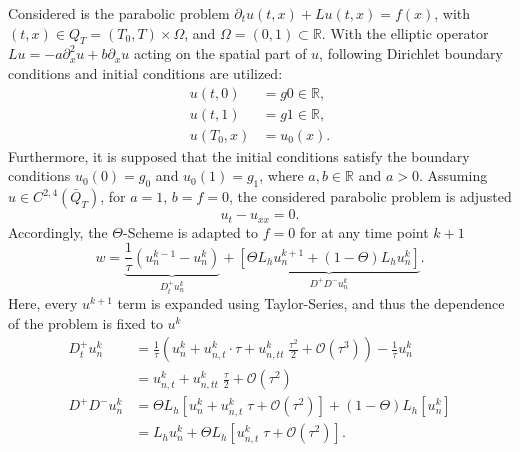 \newcommand{\assignmentDate}{December 15th, 2019}



Considered is the parabolic problem	$\partial_t u(t,x) + L u(t,x) = f(x)$, with $(t,x) \in Q_T = (T_0, T) \times \Omega$, and $\Omega = (0,1) \subset \mathbb{R}$.
With the elliptic operator $Lu = -a\partial_x^2 u + b \partial_x u$ acting on the spatial part of $u$, following Dirichlet boundary conditions and initial conditions are utilized:
\begin{align*}
	u(t,0) &= g0 \in \mathbb{R} \text{,} \\
	u(t,1) &= g1 \in \mathbb{R} \text{,} \\
	u(T_0,x) &= u_0(x)	 		\text{.}
\end{align*}
Furthermore, it is supposed that the initial conditions satisfy the boundary conditions $u_0(0) = g_0$ and $u_0(1) = g_1$, where $a,b \in \mathbb{R}$ and $a>0$.
%
Assuming $u \in C^{2,4}(\bar{Q}_T)$, for $a = 1$, $b = f = 0$, the considered parabolic problem is adjusted
\begin{equation}
	\label{eq:PDE}
	u_t - u_{xx} = 0 \text{.}
\end{equation}
Accordingly, the $\Theta$-Scheme is adapted to $f = 0$ for at any time point $k + 1$
\begin{equation}
	w = \underbrace{\frac{1}{\tau} \left( u_n^{k-1} - u_n^k \right)}_{D_t^+ u^k_n }+ \underbrace{\left[\Theta L_h u_n^{k + 1} + (1 - \Theta) L_h u_n^k\right]}_{D^+D^- u^k_n} \text{.}
\end{equation}
Here, every $u^{k + 1}$ term is expanded using Taylor-Series, and thus the dependence of the problem is fixed to $u^k$
\begin{align}
	\nonumber
	D_t^+ u^k_n  &= \frac{1}{\tau} \left( u^k_n + u^k_{n,t} \cdot \tau + u^k_{n,tt} \; \frac{\tau^2}{2} + \mathcal{O}(\tau^3)  \right) -\frac{1}{\tau} u_n^k \\
	\label{eq:Dt_2}
				 &= u^k_{n,t} + u^k_{n,tt} \; \frac{\tau}{2} + \mathcal{O}(\tau^2) 													  \\
	\nonumber
	D^+D^- u^k_n &= \Theta L_h \left[ u^k_n + u^k_{n,t} \; \tau + \mathcal{O}(\tau^2) \right] + (1-\Theta) L_h \left[ u^k_n \right] \\
	\label{eq:Dxx_2}
				 &=L_h u^k_n + \Theta L_h \left[ u^k_{n,t} \; \tau + \mathcal{O}(\tau^2) \right] \text{.}
\end{align}
